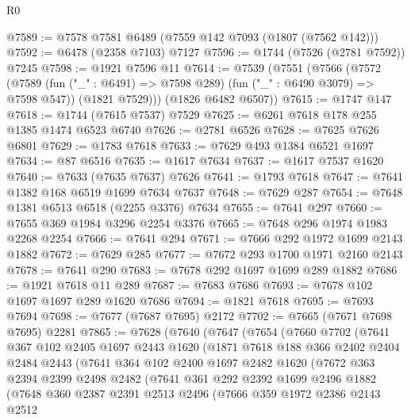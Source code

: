 \begin{lexlean}{R0}
\begin{coremodule}
@7589 := @7578 @7581 @6489 (@7559 @142 @7093 (@1807 (@7562 @142)))
@7592 := @6478 (@2358 @7103) @7127
@7596 := @1744 (@7526 (@2781 @7592)) @7245
@7598 := @1921 @7596 @11
@7614 := @7539
    (@7551
      (@7566
        (@7572
          (@7589 (fun ("_" : @6491) => @7598 @289) (fun ("_" : @6490 @3079) => @7598 @547))
          (@1821 @7529)))
      (@1826 @6482 @6507))
@7615 := @1747 @147
@7618 := @1744 (@7615 @7537) @7529
@7625 := @6261 @7618 @178 @255 @1385 @1474 @6523 @6740
@7626 := @2781 @6526
@7628 := @7625 @7626 @6801
@7629 := @1783 @7618
@7633 := @7629 @493 @1384 @6521 @1697
@7634 := @87 @6516
@7635 := @1617 @7634
@7637 := @1617 @7537 @1620
@7640 := @7633 (@7635 @7637) @7626
@7641 := @1793 @7618
@7647 := @7641 @1382 @168 @6519 @1699 @7634 @7637
@7648 := @7629 @287
@7654 := @7648 @1381 @6513 @6518 (@2255 @3376) @7634
@7655 := @7641 @297
@7660 := @7655 @369 @1984 @3296 @2254 @3376
@7665 := @7648 @296 @1974 @1983 @2268 @2254
@7666 := @7641 @294
@7671 := @7666 @292 @1972 @1699 @2143 @1882
@7672 := @7629 @285
@7677 := @7672 @293 @1700 @1971 @2160 @2143
@7678 := @7641 @290
@7683 := @7678 @292 @1697 @1699 @289 @1882
@7686 := @1921 @7618 @11 @289
@7687 := @7683 @7686
@7693 := @7678 @102 @1697 @1697 @289 @1620 @7686
@7694 := @1821 @7618
@7695 := @7693 @7694
@7698 := @7677 (@7687 @7695) @2172
@7702 := @7665 (@7671 @7698 @7695) @2281
@7865 := @7628
    (@7640
      (@7647
        (@7654
          (@7660
            @7702
            (@7641
              @367
              @102
              @2405
              @1697
              @2443
              @1620
              (@1871
                @7618
                @188
                @366
                @2402
                @2404
                @2484
                @2443
                (@7641
                  @364
                  @102
                  @2400
                  @1697
                  @2482
                  @1620
                  (@7672
                    @363
                    @2394
                    @2399
                    @2498
                    @2482
                    (@7641
                      @361
                      @292
                      @2392
                      @1699
                      @2496
                      @1882
                      (@7648
                        @360
                        @2387
                        @2391
                        @2513
                        @2496
                        (@7666
                          @359
                          @1972
                          @2386
                          @2143
                          @2512

\end{coremodule}
\end{lexlean}

